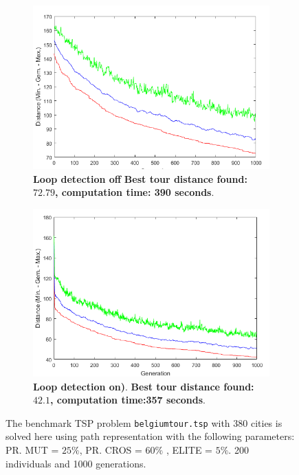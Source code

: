 \begin{figure}[!]
\centering
\begin{subfigure}{0.45\textwidth}
  \centering
  \includegraphics[width=1\textwidth]{../figures/question_5/FPS_off_gens.png}
      \caption{\textbf{Loop detection off} \textbf{Best tour distance found: $\mathbf{72.79}$, computation time: 390 seconds}. } 
      \label{fig:fps_vraag5_off_gen}
\end{subfigure}
\hspace{0.05\textwidth}
\begin{subfigure}{0.45\textwidth}
  \centering
  \includegraphics[width=1\textwidth]{../figures/question_5/FPS_on_gens.png}
      \caption{\textbf{Loop detection on)}.  \textbf{Best tour distance found: $\mathbf{42.1}$, computation time:357 seconds}.} 
      \label{fig:fps_vraag5_off_gen}
\end{subfigure}
\caption{The benchmark TSP problem \texttt{belgiumtour.tsp} with 380 cities is solved here using path representation with the following parameters: PR. MUT = $25\%$, PR. CROS = $60\%$ , ELITE = $5\%$. 200 individuals and 1000 generations.}
\label{fig:fps_gen}
\end{figure}

